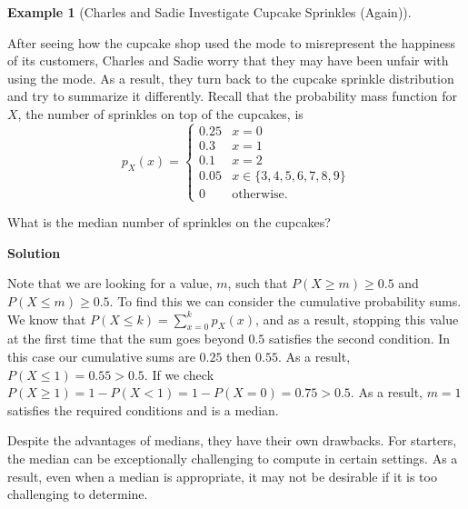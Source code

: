 \documentclass[
  letterpaper,
  DIV=11,
  numbers=noendperiod]{scrreprt}
\theoremstyle{definition}
\theoremstyle{definition}
\newtheorem{example}{Example}[chapter]
\theoremstyle{definition}
\theoremstyle{remark}
\begin{document}
\begin{example}[Charles and Sadie Investigate Cupcake Sprinkles
(Again)]\protect\hypertarget{exm-median}{}\label{exm-median}

After seeing how the cupcake shop used the mode to misrepresent the
happiness of its customers, Charles and Sadie worry that they may have
been unfair with using the mode. As a result, they turn back to the
cupcake sprinkle distribution and try to summarize it differently.
Recall that the probability mass function for \(X\), the number of
sprinkles on top of the cupcakes, is
\[p_X(x) = \begin{cases} 0.25 & x = 0 \\ 0.3 & x = 1 \\ 0.1 & x = 2 \\ 0.05 & x \in \{3,4,5,6,7,8,9\} \\ 0 & \text{otherwise}.\end{cases}\]

What is the median number of sprinkles on the cupcakes?

\begin{tcolorbox}[enhanced jigsaw, colback=white, colframe=quarto-callout-color-frame, arc=.35mm, leftrule=.75mm, rightrule=.15mm, opacityback=0, breakable, bottomrule=.15mm, left=2mm, toprule=.15mm]

\vspace{-3mm}\textbf{Solution}\vspace{3mm}

Note that we are looking for a value, \(m\), such that
\(P(X \geq m) \geq 0.5\) and \(P(X \leq m) \geq 0.5\). To find this we
can consider the cumulative probability sums. We know that
\(P(X \leq k) = \sum_{x=0}^k p_X(x)\), and as a result, stopping this
value at the first time that the sum goes beyond \(0.5\) satisfies the
second condition. In this case our cumulative sums are \(0.25\) then
\(0.55\). As a result, \(P(X \leq 1) = 0.55 > 0.5\). If we check
\(P(X \geq 1) = 1 - P(X < 1) = 1 - P(X = 0) = 0.75 > 0.5\). As a result,
\(m=1\) satisfies the required conditions and is a median.

\end{tcolorbox}

\end{example}

Despite the advantages of medians, they have their own drawbacks. For
starters, the median can be exceptionally challenging to compute in
certain settings. As a result, even when a median is appropriate, it may
not be desirable if it is too challenging to determine.
\end{document}
